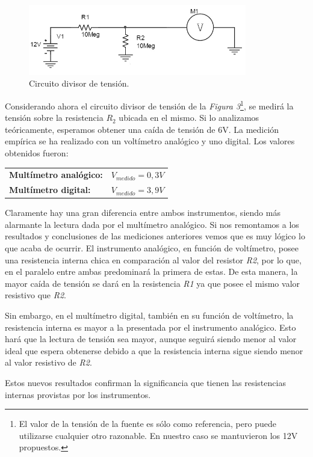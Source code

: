 \documentclass{article}
\begin{document}
\begin{figure}[h]
	\centering
	\includegraphics[width=0.85\textwidth]{images/p1-item-8.jpg}
	\caption{Circuito divisor de tensión.}
\end{figure}
\bigskip\bigskip


	Considerando ahora el circuito divisor de tensión de la \textit{Figura 3}\footnote{El valor de la tensión de la fuente es sólo como referencia, pero puede utilizarse cualquier otro razonable. En nuestro caso se mantuvieron los 12V propuestos.}, se medirá la tensión sobre la resistencia $R_2$ ubicada en el mismo. Si lo analizamos teóricamente, esperamos obtener una caída de tensión de 6V. La medición empírica se ha realizado con un voltímetro analógico y uno digital. Los valores obtenidos fueron:
\bigskip\medskip

\begin{tabular}{l l}
	\textbf{Multímetro analógico:} & $V_{medido} = 0,3V$ \smallskip\\
	\textbf{Multímetro digital:} & $V_{medido} = 3,9V$ \\
\end{tabular}
\bigskip\bigskip


\noindent Claramente hay una gran diferencia entre ambos instrumentos, siendo más alarmante la lectura dada por el multímetro analógico. Si nos remontamos a los resultados y conclusiones de las mediciones anteriores vemos que es muy lógico lo que acaba de ocurrir. El instrumento analógico, en función de voltímetro, posee una resistencia interna chica en comparación al valor del resistor \textit{R2}, por lo que, en el paralelo entre ambas predominará la primera de estas. De esta manera, la mayor caída de tensión se dará en la resistencia \textit{R1} ya que posee el mismo valor resistivo que \textit{R2}.
	\par
	Sin embargo, en el multímetro digital, también en su función de voltímetro, la resistencia interna es mayor a la presentada por el instrumento analógico. Esto hará que la lectura de tensión sea mayor, aunque seguirá siendo menor al valor ideal que espera obtenerse debido a que la resistencia interna sigue siendo menor al valor resistivo de \textit{R2}.
	\par
	Estos nuevos resultados confirman la significancia que tienen las resistencias internas provistas por los instrumentos.
\bigskip\bigskip
\end{document}
